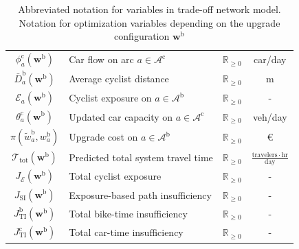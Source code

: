 \documentclass[lettersize,journal]{IEEEtran}
\begin{document}
\begin{table}[h!]
\begin{tabular}{c|l|c|c}
$\phi^\mathrm{c}_{a}(\boldsymbol{w}^\mathrm{b})$ & Car flow on arc $a \in \mathcal{A}^\mathrm{c}$ & $\mathbb{R}_{\geq 0}$ & car/day \\
$\bar{D}_{a}^\mathrm{b}(\boldsymbol{w}^\mathrm{b})$ & Average cyclist distance & $\mathbb{R}_{\geq 0}$ & m \\ 
$\mathcal{E}_{a}(\boldsymbol{w}^\mathrm{b})$ & Cyclist exposure on $a \in \mathcal{A}^\mathrm{b}$ & $\mathbb{R}_{\geq 0}$ & - \\ 
$\theta^\mathrm{c}_{a}(\boldsymbol{w}^\mathrm{b})$ & Updated car capacity on $a \in \mathcal{A}^\mathrm{c}$ & $\mathbb{R}_{\geq 0}$ & veh/day \\
$\pi(\tilde{w}_{a}^\mathrm{b},w_{a}^\mathrm{b})$ & Upgrade cost on $a \in \mathcal{A}^\mathrm{b}$ & $\mathbb{R}_{\geq 0}$ &$\text{€}$  \\ 
$\mathcal{T}_{\mathrm{tot}}(\boldsymbol{w}^\mathrm{b})$ & Predicted total system travel time & $\mathbb{R}_{\geq 0}$  & $\frac{\mathrm{travelers}\cdot \mathrm{hr}}{\mathrm{day}}$ \\
$J_{\mathcal{E}}(\boldsymbol{w}^\mathrm{b})$ & Total cyclist exposure & $\mathbb{R}_{\geq 0}$ & -\\
$J_{\mathrm{SI}}(\boldsymbol{w}^\mathrm{b})$ & Exposure-based path insufficiency & $\mathbb{R}_{\geq 0}$ & - \\ 
$J_{\mathrm{TI}}^\mathrm{b}(\boldsymbol{w}^\mathrm{b})$ & Total bike-time insufficiency & $\mathbb{R}_{\geq 0}$ & - \\ 
$J_{\mathrm{TI}}^\mathrm{c}(\boldsymbol{w}^\mathrm{b})$ & Total car-time insufficiency & $\mathbb{R}_{\geq 0}$ & - \\ 
 \hline
\end{tabular}
\caption{\footnotesize Abbreviated notation for variables in trade-off network model. Notation for optimization variables depending on the upgrade configuration $\boldsymbol{w}^\mathrm{b}$}
\label{table:notation_summary}
\end{table}
\end{document}

